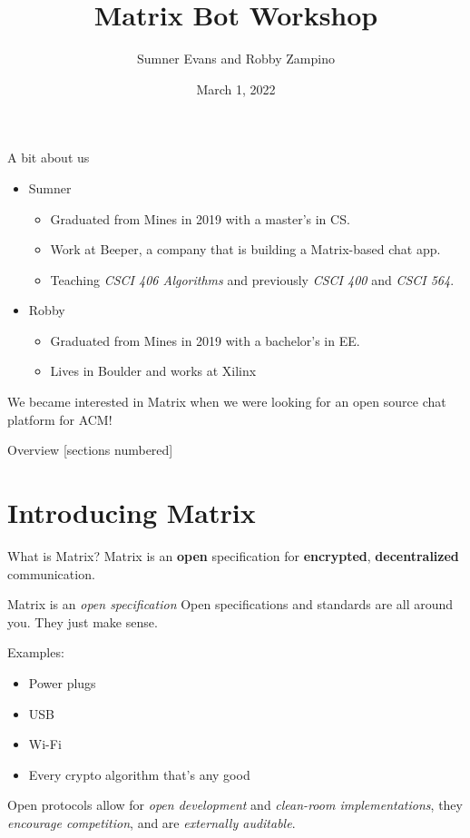 \documentclass{acm}
\title{Matrix Bot Workshop}
\author{Sumner Evans and Robby Zampino}
\date{March 1, 2022}
\begin{document}
\begin{frame}{A bit about us}
    \begin{itemize}
        \item Sumner
            \begin{itemize}
                \item Graduated from Mines in 2019 with a master's in CS.
                \item Work at Beeper, a company that is building a Matrix-based
                    chat app.
                \item Teaching \textit{CSCI 406 Algorithms} and previously
                    \textit{CSCI 400} and \textit{CSCI 564}.
            \end{itemize}

        \item Robby
            \begin{itemize}
                \item Graduated from Mines in 2019 with a bachelor's in EE.
                \item Lives in Boulder and works at Xilinx
            \end{itemize}
    \end{itemize}

    We became interested in Matrix when we were looking for an open source chat
    platform for ACM!
\end{frame}

\begin{frame}{Overview}
    [sections numbered]
    \tableofcontents[hideallsubsections]
\end{frame}

\section{Introducing Matrix}

\begin{frame}{What is Matrix?}
    Matrix is an \textbf{open} specification for \textbf{encrypted},
    \textbf{decentralized} communication.
\end{frame}

\begin{frame}{Matrix is an \textit{open specification}}
    Open specifications and standards are all around you. They just make
    sense\texttrademark.

    Examples:\pause
    \begin{itemize}
        \item Power plugs
        \item USB
        \item Wi-Fi
        \item Every crypto algorithm that's any good
    \end{itemize}
    \pause

    Open protocols allow for \textit{open development} and  \textit{clean-room
    implementations}, they \textit{encourage competition}, and are
    \textit{externally auditable}.
\end{frame}
\end{document}
